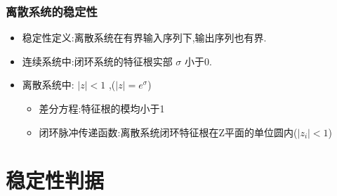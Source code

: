 \documentclass[table]{beamer}
\begin{document}
\begin{frame}
\frametitle{离散系统的稳定性}
\label{sec-1-2}

\begin{itemize}
\item 稳定性定义:离散系统在有界输入序列下,输出序列也有界.
\item <2->连续系统中:闭环系统的特征根实部 $\sigma$  小于0.
\item <3->离散系统中:  $|z|<1$ ,($|z|=e^{\sigma}$)
\begin{itemize}
\item 差分方程:特征根的模均小于1
\item 闭环脉冲传递函数:离散系统闭环特征根在Z平面的单位圆内($|z_i|<1$)
\end{itemize}
\end{itemize}
\end{frame}
\section{稳定性判据}
\label{sec-2}
\end{document}
